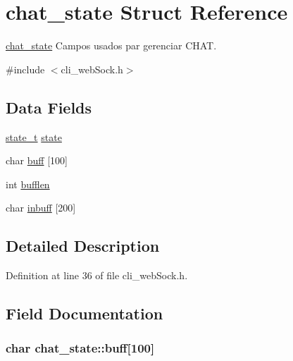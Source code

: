 \hypertarget{structchat__state}{
\section{chat\_\-state Struct Reference}
\label{structchat__state}
}


\hyperlink{structchat__state}{chat\_\-state} Campos usados par gerenciar CHAT.  




{\ttfamily \#include $<$cli\_\-webSock.h$>$}

\subsection*{Data Fields}
\begin{DoxyCompactItemize}
\item 
\hyperlink{cli__webSock_8h_aa0aafed44fec19806d8f9ad834be1248}{state\_\-t} \hyperlink{structchat__state_ace3128c5cfad854aece0a133ef9d54f0}{state}
\item 
char \hyperlink{structchat__state_ab41473187c85f68e2094edfbc19a61dd}{buff} \mbox{[}100\mbox{]}
\item 
int \hyperlink{structchat__state_aaf15c3058b1e28fa18ae5e18392f0c48}{bufflen}
\item 
char \hyperlink{structchat__state_adea205d568097f74d166ecdfdafd170c}{inbuff} \mbox{[}200\mbox{]}
\end{DoxyCompactItemize}


\subsection{Detailed Description}


Definition at line 36 of file cli\_\-webSock.h.



\subsection{Field Documentation}
\hypertarget{structchat__state_ab41473187c85f68e2094edfbc19a61dd}{
\subsubsection[{buff}]{\setlength{\rightskip}{0pt plus 5cm}char {\bf chat\_\-state::buff}\mbox{[}100\mbox{]}}}
\label{structchat__state_ab41473187c85f68e2094edfbc19a61dd}


